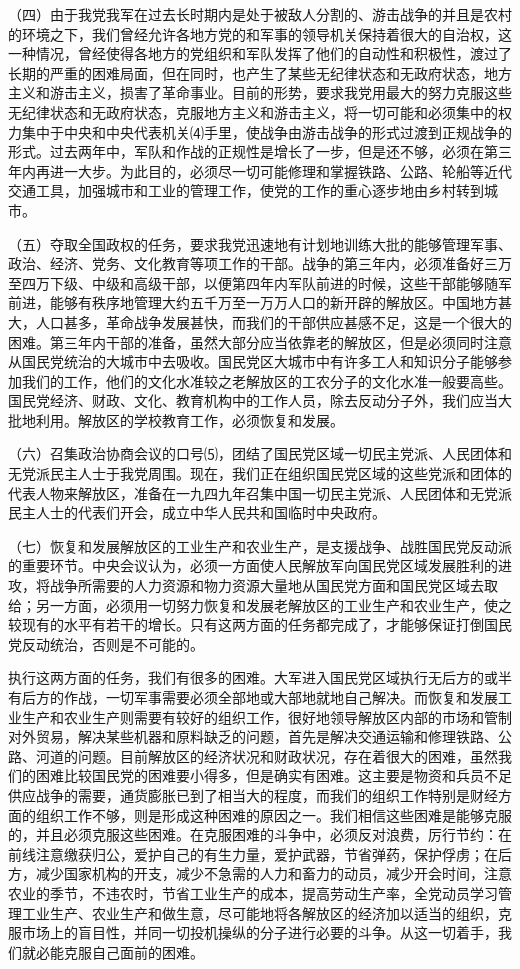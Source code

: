 \documentclass[UTF-8, a5paper, 12pt]{ctexart}
\begin{document}
（四）由于我党我军在过去长时期内是处于被敌人分割的、游击战争的并且是农村的环境之下，我们曾经允许各地方党的和军事的领导机关保持着很大的自治权，这一种情况，曾经使得各地方的党组织和军队发挥了他们的自动性和积极性，渡过了长期的严重的困难局面，但在同时，也产生了某些无纪律状态和无政府状态，地方主义和游击主义，损害了革命事业。目前的形势，要求我党用最大的努力克服这些无纪律状态和无政府状态，克服地方主义和游击主义，将一切可能和必须集中的权力集中于中央和中央代表机关⑷手里，使战争由游击战争的形式过渡到正规战争的形式。过去两年中，军队和作战的正规性是增长了一步，但是还不够，必须在第三年内再进一大步。为此目的，必须尽一切可能修理和掌握铁路、公路、轮船等近代交通工具，加强城市和工业的管理工作，使党的工作的重心逐步地由乡村转到城市。

（五）夺取全国政权的任务，要求我党迅速地有计划地训练大批的能够管理军事、政治、经济、党务、文化教育等项工作的干部。战争的第三年内，必须准备好三万至四万下级、中级和高级干部，以便第四年内军队前进的时候，这些干部能够随军前进，能够有秩序地管理大约五千万至一万万人口的新开辟的解放区。中国地方甚大，人口甚多，革命战争发展甚快，而我们的干部供应甚感不足，这是一个很大的困难。第三年内干部的准备，虽然大部分应当依靠老的解放区，但是必须同时注意从国民党统治的大城市中去吸收。国民党区大城市中有许多工人和知识分子能够参加我们的工作，他们的文化水准较之老解放区的工农分子的文化水准一般要高些。国民党经济、财政、文化、教育机构中的工作人员，除去反动分子外，我们应当大批地利用。解放区的学校教育工作，必须恢复和发展。

（六）召集政治协商会议的口号⑸，团结了国民党区域一切民主党派、人民团体和无党派民主人士于我党周围。现在，我们正在组织国民党区域的这些党派和团体的代表人物来解放区，准备在一九四九年召集中国一切民主党派、人民团体和无党派民主人士的代表们开会，成立中华人民共和国临时中央政府。

（七）恢复和发展解放区的工业生产和农业生产，是支援战争、战胜国民党反动派的重要环节。中央会议认为，必须一方面使人民解放军向国民党区域发展胜利的进攻，将战争所需要的人力资源和物力资源大量地从国民党方面和国民党区域去取给；另一方面，必须用一切努力恢复和发展老解放区的工业生产和农业生产，使之较现有的水平有若干的增长。只有这两方面的任务都完成了，才能够保证打倒国民党反动统治，否则是不可能的。

执行这两方面的任务，我们有很多的困难。大军进入国民党区域执行无后方的或半有后方的作战，一切军事需要必须全部地或大部地就地自己解决。而恢复和发展工业生产和农业生产则需要有较好的组织工作，很好地领导解放区内部的市场和管制对外贸易，解决某些机器和原料缺乏的问题，首先是解决交通运输和修理铁路、公路、河道的问题。目前解放区的经济状况和财政状况，存在着很大的困难，虽然我们的困难比较国民党的困难要小得多，但是确实有困难。这主要是物资和兵员不足供应战争的需要，通货膨胀已到了相当大的程度，而我们的组织工作特别是财经方面的组织工作不够，则是形成这种困难的原因之一。我们相信这些困难是能够克服的，并且必须克服这些困难。在克服困难的斗争中，必须反对浪费，厉行节约：在前线注意缴获归公，爱护自己的有生力量，爱护武器，节省弹药，保护俘虏；在后方，减少国家机构的开支，减少不急需的人力和畜力的动员，减少开会时间，注意农业的季节，不违农时，节省工业生产的成本，提高劳动生产率，全党动员学习管理工业生产、农业生产和做生意，尽可能地将各解放区的经济加以适当的组织，克服市场上的盲目性，并同一切投机操纵的分子进行必要的斗争。从这一切着手，我们就必能克服自己面前的困难。
\end{document}
